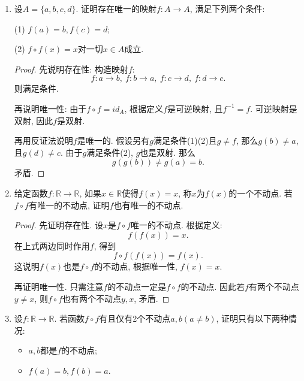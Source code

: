 \documentclass[UTF8,11pt, a4paper, oneside, fontset=none]{ctexbook}
\begin{document}
\begin{enumerate}
\begin{proof}

在$y = \sinh x = \frac{e^x - e^{-x}}{2}$中作代换, 令$u = e^x$, 注意$u >0$. 于是得到
\[
u^2 - 2uy -1 =0.
\]
解得
\[
u = y \pm \sqrt{y^2 +1}.
\]
取正解, 得
\[
u = y + \sqrt{y^2 +1} = e^x \Rightarrow x = \ln (y + \sqrt{y^2 +1}).
\]
因此
\[
y = \operatorname{arcsinh} x = \ln (x + \sqrt{x^2 +1}).
\]
同理得
\[
y = \operatorname{arccosh} x = \ln (x + \sqrt{x^2 -1}).
\]

\end{proof}

\item 设$A = \{ a, b, c, d\}$. 证明存在唯一的映射$f : A \to A$, 满足下列两个条件:

(1) $f(a) = b, f(c) = d$;

(2) $f \circ f(x) = x$对一切$x \in A$成立.

\begin{proof}

先说明存在性: 构造映射$f$:
\[
f : a \to b, \ f : b \to a, \ f : c \to d, \ f : d \to c.
\]
则满足条件. 

再说明唯一性: 由于$f \circ f = id_A$, 根据定义$f$是可逆映射, 且$f^{-1} = f$. 可逆映射是双射, 因此$f$是双射. 

再用反证法说明$f$是唯一的. 假设另有$g$满足条件(1)(2)且$g \neq f$, 那么$g (b) \neq a$, 且$g (d) \neq c$. 由于$g$满足条件(2), $g$也是双射. 那么
\[
g(g(b)) \neq g(a) = b. 
\]
矛盾.

\end{proof}

\item 给定函数$f : \mathbb R \to \mathbb R$, 如果$x \in \mathbb R$使得$f(x) =x$, 称$x$为$f(x)$的一个不动点. 若$f \circ f$有唯一的不动点, 证明$f$也有唯一的不动点.

\begin{proof}

先证明存在性. 设$x$是$f \circ f$唯一的不动点. 根据定义:
\[
f(f(x)) = x. 
\]
在上式两边同时作用$f$, 得到
\[
f\circ f(f(x)) = f(x).
\]
这说明$f(x)$也是$f \circ f$的不动点, 根据唯一性, $f(x) = x$.

再证明唯一性. 只需注意$f$的不动点一定是$f \circ f$的不动点. 因此若$f$有两个不动点$y \neq x$, 则$f \circ f$也有两个不动点$y, x$, 矛盾.

\end{proof}

\item 设$f : \mathbb R \to \mathbb R$. 若函数$f\circ f$有且仅有2个不动点$a, b (a \neq b)$, 证明只有以下两种情况:
\begin{itemize}
\item[(1)] $a, b$都是$f$的不动点;
\item[(2)] $f(a)=b, f(b) =a$.
\end{itemize}


\end{enumerate}
\end{document}
